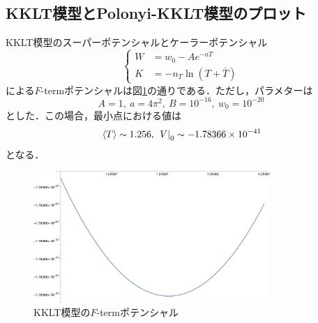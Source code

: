 \documentclass[a4paper,uplatex,dvipdfmx]{jsarticle}
\theoremstyle{definition}
\begin{document}
\subsection{KKLT模型とPolonyi-KKLT模型のプロット}

KKLT模型のスーパーポテンシャルとケーラーポテンシャル
\begin{equation}
   \left\{
      \begin{alignedat}{1}
         W
         &=
         w_{0}
         -
         Ae^{-aT}
         \\
         K
         &=
         -n_{T}\ln(T+\bar{T})
      \end{alignedat}
   \right.
   \nonumber
\end{equation}
による$F$-termポテンシャルは図\ref{plot_KKLT_model}の通りである．ただし，パラメターは
\begin{equation}
   A=1
   ,\ 
   a=4 \pi^2
   ,\ 
   B=10^{-16}
   ,\ 
   w_{0}=10^{-20}
   \nonumber
\end{equation}
とした．この場合，最小点における値は
\begin{equation}
   \ev*{T}
   \sim
   1.256
   ,\ 
   \left.V\right|_{0}
   \sim
   -1.78366\times 10^{-41}
   \label{minimum_KKLT}
\end{equation}
となる．

\begin{figure}[ht]
   \centering
   \includegraphics[width=0.8\textwidth]{fig/kklt_minimum.jpg}
   \caption{KKLT模型の$F$-termポテンシャル}
   \label{plot_KKLT_model}
\end{figure}
\end{document}
